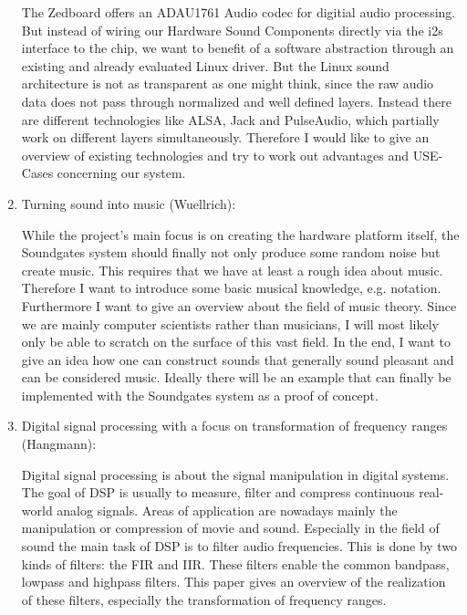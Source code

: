 \begin{enumerate}
	The Zedboard offers an ADAU1761 Audio codec for digitial audio processing. But instead of wiring our Hardware Sound Components directly via the i2s interface to the chip, we want to benefit of a software abstraction through an existing and already evaluated Linux driver. But the Linux sound architecture is not as transparent as one might think, since the raw audio data does not pass through normalized and well defined layers. Instead there are different technologies like ALSA, Jack and PulseAudio, which partially work on different layers simultaneously. Therefore I would like to give an overview of existing technologies and try to work out advantages and USE-Cases concerning our system.
	\item Turning sound into music (Wuellrich):
	
	While the project's main focus is on creating the hardware platform itself, the Soundgates system should finally not only produce some random noise but create music. This requires that we have at least a rough idea about music. Therefore I want to introduce some basic musical knowledge, e.g. notation. Furthermore I want to give an overview about the field of music theory. Since we are mainly computer scientists rather than musicians, I will most likely only be able to scratch on the surface of this vast field. In the end, I want to give an idea how one can construct sounds that generally sound pleasant and can be considered music. Ideally there will be an example that can finally be implemented with the Soundgates system as a proof of concept.
	\item Digital signal processing with a focus on transformation of frequency ranges (Hangmann):
	
	Digital signal processing is about the signal manipulation in digital systems. The goal of \ac{DSP} is usually to measure, filter and compress continuous real-world analog signals. Areas of application are nowadays mainly the manipulation or compression of movie and sound. Especially in the field of sound the main task of \ac{DSP} is to filter audio frequencies. This is done by two kinds of filters: the \ac{FIR} and \ac{IIR}. These filters enable the common bandpass, lowpass and highpass filters. This paper gives an overview of the realization of these filters, especially the transformation of frequency ranges. 
\end{enumerate}